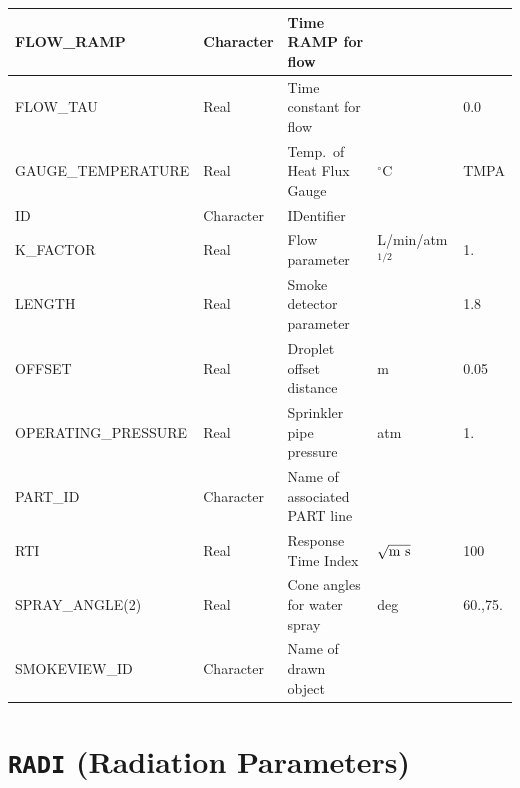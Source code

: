\documentclass[11pt]{book}
\begin{document}
\begin{table}[H]
\begin{tabular*}{\textwidth}{@{\extracolsep{\fill}}|l|l|l|l|l|}
{\ct FLOW\_RAMP}                        & Character     & Time {\ct RAMP} for flow         &                       &           \\ \hline
{\ct FLOW\_TAU}                         & Real          & Time constant for flow           &                       & 0.0       \\ \hline
{\ct GAUGE\_TEMPERATURE}                & Real          & Temp.~of Heat Flux Gauge         & $^\circ$C             & {\ct TMPA}\\ \hline
{\ct ID}                                & Character     & IDentifier                       &                       &           \\ \hline
{\ct K\_FACTOR}                         & Real          & Flow parameter                   & L/min/atm$^{1/2}$     & 1.        \\ \hline
{\ct LENGTH}                            & Real          & Smoke detector parameter         &                       & 1.8       \\ \hline
{\ct OFFSET}                            & Real          & Droplet offset distance          & m                     & 0.05      \\ \hline
{\ct OPERATING\_PRESSURE}               & Real          & Sprinkler pipe pressure          & atm                   & 1.        \\ \hline
{\ct PART\_ID}                          & Character     & Name of associated PART line     &                       &           \\ \hline
{\ct RTI}                               & Real          & Response Time Index              & $\sqrt{\hbox{m~s}}$   & 100       \\ \hline
{\ct SPRAY\_ANGLE(2)}                   & Real          & Cone angles for water spray      & deg                   & 60.,75.   \\ \hline
{\ct SMOKEVIEW\_ID}                     & Character     & Name of drawn object             &                       &           \\ \hline
\end{tabular*}
\end{table}

\vspace{\baselineskip}

\vfill

\section{\texorpdfstring{{\tt RADI}}{RADI} (Radiation Parameters)}
\end{document}
